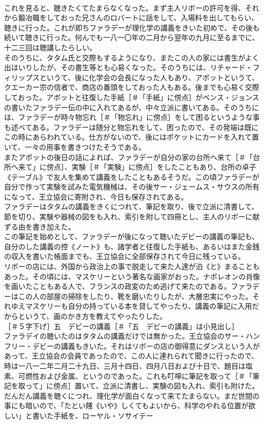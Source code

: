 \documentclass[8pt]{extreport}
\begin{document}
\begin{CJK}{UTF8}{min}
\\	これを見ると、聴きたくてたまらなくなった。まず主人リボーの許可を得、それから鍛冶職をしておった兄さんのロバートに話をして、入場料を出してもらい、聴きに行った。これが即ちファラデーが理化学の講義をきいた初めで、その後も続いて聴きに行った。何んでも一八一〇年の二月から翌年の九月に至るまでに、十二三回は聴講したらしい。
\\	そのうちに、タタム氏と交際もするようになり、またこの人の家には書生がよく出はいりしたが、その書生等とも心易くなった。そのうちには、リチャード・フィリップスというて、後に化学会の会長になった人もあり、アボットというて、クエーカー宗の信者で、商店の番頭をしておった人もある。後までも心易く交際しておった。アボットと往復した手紙［＃「手紙」に傍点］がベンス・ジョンスの書いたファラデー伝の中に入れてあるが、中々立派に書いてある。そのうちには、ファラデーが時々物忘れ［＃「物忘れ」に傍点］をして困るというような事も述べてある。ファラデーは随分と物忘れをして、困ったので、その発端は既にこの時にあらわれている。仕方がないので、後にはポケットにカードを入れて置いて、一々の用事を書きつけたそうである。
\\	またアボットの後日の話によれば、ファラデーが自分の家の台所へ来て［＃「台所へ来て」に傍点］、実験［＃「実験」に傍点］をしたこともあり、台所の卓子《テーブル》で友人を集めて講義をしたこともあるそうだ。この頃ファラデーが自分で作って実験を試みた電気機械は、その後サー・ジェームス・サウスの所有になって、王立協会に寄附され、今日も保存されてある。
\\	ファラデーはタタムの講義をきくにつれて、筆記を取り、後で立派に清書して、節を切り、実験や器械の図をも入れ、索引を附して四冊とし、主人のリボーに献ずる由を書き加えた。
\\	この筆記を始めとして、ファラデーが後になって聴いたデビーの講義の筆記も、自分のした講義の控《ノート》も、諸学者と往復した手紙も、あるいはまた金銭の収入を書いた帳面までも、王立協会に全部保存されて今日に残っている。
\\	リボーの店には、外国から政治上の事で脱走して来た人達が泊《と》まることもあった。その頃には、マスケリーという著名な画家がおった。ナポレオンの肖像を画いたこともある人で、フランスの政変のため逃げて来たのである。ファラデーはこの人の部屋の掃除をしたり、靴を磨いたりしたが、大層忠実にやった。それゆえマスケリーも自分の持っている本を貸してやったり、講義の筆記に入用だからというて、画のかき方を教えてやったりした。
\\	［＃５字下げ］五　デビーの講義［＃「五　デビーの講義」は小見出し］
\\	ファラデイの聴いたのはタタムの講義だけでは無かった。王立協会のサー・ハンフリー・デビーの講義もきいた。それはリボーの店の御得意にダンスという人があって、王立協会の会員であったので、この人に連れられて聞きに行ったので、時は一八一二年二月二十九日、三月十四日、四月八日および十日で、題目は塩素、可燃性および金属、というのであった。これも叮嚀に筆記を取って［＃「筆記を取って」に傍点］置いて、立派に清書し、実験の図も入れ、索引も附けた。だんだん講義を聴くにつれ、理化学が面白くなって来てたまらない。まだ世間の事にも暗いので、「たとい賤《いや》しくてもよいから、科学のやれる位置が欲しい」と書いた手紙を、ローヤル・ソサイテー

\end{CJK}
\end{document}
